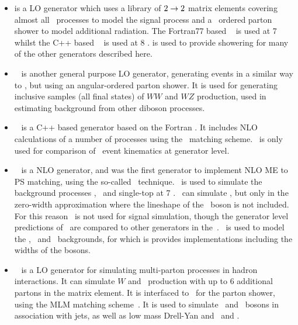 \begin{itemize}
    \item \pythia is a LO generator which uses a library of $2\rightarrow2$
    matrix elements covering almost all \sm\ processes to model the signal
    process and a \pt\ ordered parton shower to model additional radiation.
    The Fortran77 based
    ~\cite{pythia} is used at 7 \tev\, whilst the C++ based
    ~\cite{Sjostrand:2007gs} is used at 8 \tev. \pythia is used to
    provide showering for many of the other generators described here.

    \item \herwig~\cite{Herwig} is another general purpose LO generator, generating events in a
    similar way to \pythia, but using an angular-ordered parton shower.
    It is used for generating inclusive samples (all final
    states) of $WW$ and $WZ$ production, used in estimating background from
    other diboson processes.

    \item \herwigPP~\cite{Bahr:2008pv} is a C++ based generator based on the
    Fortran \herwig. It includes NLO calculations of a number of processes
    using the \powheg\ matching scheme. \herwigPP\ is only used for comparison
    of \ZZ\ event kinematics at generator level.

    \item \mcatnlo~\cite{bib:mcatnlo} is a NLO generator, and was the first
    generator to implement NLO ME to PS matching, using the so-called \mcatnlo\
    technique. \mcatnlo\ is used to simulate the background processes \ttbar,
    \Wt\ and single-top at 7 \tev. \mcatnlo\ can simulate \qqZZ, but only in the
    zero-width approximation where the lineshape of the \Z\ boson is not
    included. For this reason \mcatnlo\ is not used for signal simulation,
    though the generator level predictions of \mcatnlo\ are compared to other
    generators in the~\chap{TheoryZZProduction}. \mcatnlo\ is used to model the \ttbar,
    \WZ\ and \WW\ backgrounds, for which is provides implementations including
    the widths of the bosons.

    \item \alpgen~\cite{alpgen} is a LO generator for simulating multi-parton
    processes in hadron interactions. It can simulate $W$ and \Z\ production
    with up to 6 additional partons in the matrix element. It is interfaced to
    \herwig\ for the parton shower, using the MLM matching
    scheme~\cite{Mangano2002343}. It is used to simulate \W\ and \Z\ bosons in
    association with jets, as well as low mass Drell-Yan and \Wg\ and \Zg.



\end{itemize}

